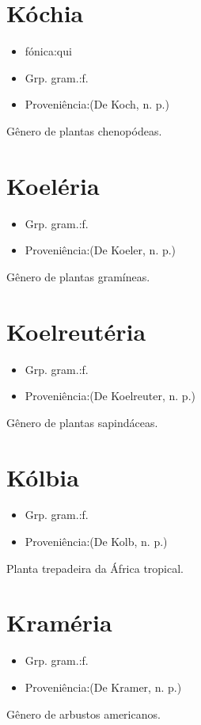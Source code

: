 \documentclass{article}
\begin{document}
\section{Kóchia}
\begin{itemize}
\item {fónica:qui}
\end{itemize}
\begin{itemize}
\item {Grp. gram.:f.}
\end{itemize}
\begin{itemize}
\item {Proveniência:(De \textunderscore Koch\textunderscore , n. p.)}
\end{itemize}
Gênero de plantas chenopódeas.
\section{Koeléria}
\begin{itemize}
\item {Grp. gram.:f.}
\end{itemize}
\begin{itemize}
\item {Proveniência:(De \textunderscore Koeler\textunderscore , n. p.)}
\end{itemize}
Gênero de plantas gramíneas.
\section{Koelreutéria}
\begin{itemize}
\item {Grp. gram.:f.}
\end{itemize}
\begin{itemize}
\item {Proveniência:(De \textunderscore Koelreuter\textunderscore , n. p.)}
\end{itemize}
Gênero de plantas sapindáceas.
\section{Kólbia}
\begin{itemize}
\item {Grp. gram.:f.}
\end{itemize}
\begin{itemize}
\item {Proveniência:(De \textunderscore Kolb\textunderscore , n. p.)}
\end{itemize}
Planta trepadeira da África tropical.
\section{Kraméria}
\begin{itemize}
\item {Grp. gram.:f.}
\end{itemize}
\begin{itemize}
\item {Proveniência:(De \textunderscore Kramer\textunderscore , n. p.)}
\end{itemize}
Gênero de arbustos americanos.
\end{document}
